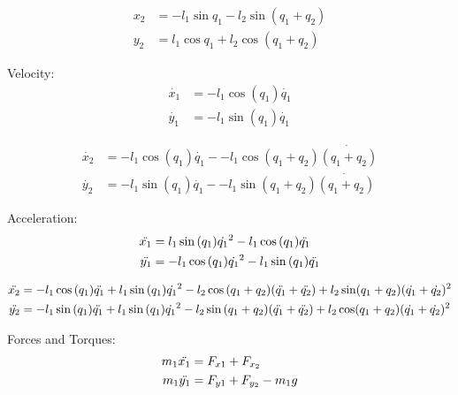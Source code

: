 \begin{equation}
\begin{split}
    x_2 &= -l_1\sin{q_1} - l_2\sin{(q_1+q_2)} \\
    y_2 &= l_1\cos{q_1} + l_2\cos{(q_1+q_2)}
\end{split}
\end{equation}

Velocity:
\begin{equation}
\begin{split}
    \Dot{x_1} &= -l_1\cos(q_1)\Dot{q_1} \\
    \Dot{y_1} &= -l_1\sin(q_1)\Dot{q_1}
\end{split}
\end{equation}

\begin{equation}
\begin{split}
    \Dot{x_2} &= -l_1\cos(q_1)\Dot{q_1} - -l_1\cos(q_1+q_2)\Dot{(q_1+q_2)} \\
    \Dot{y_2} &= -l_1\sin(q_1)\Dot{q_1} - -l_1\sin(q_1+q_2)\Dot{(q_1+q_2)}
\end{split}
\end{equation}

Acceleration:
\begin{equation}
\begin{split}
    \Ddot{x_1} &= l_1 \sin{(q_1)}\Dot{q_1}^2 - l_1 \cos{(q_1)}\Ddot{q_1} \\
    \Ddot{y_1} &= -l_1 \cos{(q_1)}\Dot{q_1}^2 - l_1 \sin{(q_1)}\Ddot{q_1}
\end{split}
\end{equation}

\begin{equation}
\begin{split}
    \Ddot{x_2} &= -l_1\cos{(q_1)}\Ddot{q_1} + l_1\sin{(q_1)}\Dot{q_1}^2 - l_2\cos{(q_1+q_2)}(\Ddot{q_1} + \Ddot{q_2}) + l_2\sin(q_1+q_2)(\Dot{q_1} + \Dot{q_2})^2 \\
    \Ddot{y_2} &= -l_1\sin{(q_1)}\Ddot{q_1} + l_1\sin{(q_1)}\Dot{q_1}^2 - l_2\sin{(q_1+q_2)}(\Ddot{q_1} + \Ddot{q_2}) + l_2\cos(q_1+q_2)(\Dot{q_1} + \Dot{q_2})^2
\end{split}
\end{equation}

Forces and Torques:
\begin{equation}
\begin{split}
    m_1\Ddot{x_1} &= F_{x1} + F_{x_2} \\
    m_1\Ddot{y_1} &= F_{y1} + F_{y_2} - m_1g
\end{split}
\end{equation}

